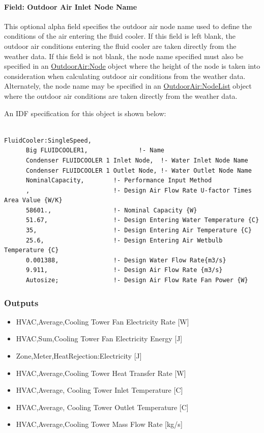 \paragraph{Field: Outdoor Air Inlet Node Name}\label{field-outdoor-air-inlet-node-name-6}

This optional alpha field specifies the outdoor air node name used to define the conditions of the air entering the fluid cooler. If this field is left blank, the outdoor air conditions entering the fluid cooler are taken directly from the weather data. If this field is not blank, the node name specified must also be specified in an \hyperref[outdoorairnode]{OutdoorAir:Node} object where the height of the node is taken into consideration when calculating outdoor air conditions from the weather data. Alternately, the node name may be specified in an \hyperref[outdoorairnodelist]{OutdoorAir:NodeList} object where the outdoor air conditions are taken directly from the weather data.

An IDF specification for this object is shown below:

\begin{lstlisting}

FluidCooler:SingleSpeed,
      Big FLUIDCOOLER1,              !- Name
      Condenser FLUIDCOOLER 1 Inlet Node,  !- Water Inlet Node Name
      Condenser FLUIDCOOLER 1 Outlet Node, !- Water Outlet Node Name
      NominalCapacity,        !- Performance Input Method
      ,                       !- Design Air Flow Rate U-factor Times Area Value {W/K}
      58601.,                 !- Nominal Capacity {W}
      51.67,                  !- Design Entering Water Temperature {C}
      35,                     !- Design Entering Air Temperature {C}
      25.6,                   !- Design Entering Air Wetbulb Temperature {C}
      0.001388,               !- Design Water Flow Rate{m3/s}
      9.911,                  !- Design Air Flow Rate {m3/s}
      Autosize;               !- Design Air Flow Rate Fan Power {W}
\end{lstlisting}

\subsubsection{Outputs}\label{outputs-8-000}

\begin{itemize}
\item
  HVAC,Average,Cooling Tower Fan Electricity Rate {[}W{]}
\item
  HVAC,Sum,Cooling Tower Fan Electricity Energy {[}J{]}
\item
  Zone,Meter,HeatRejection:Electricity {[}J{]}
\item
  HVAC,Average,Cooling Tower Heat Transfer Rate {[}W{]}
\item
  HVAC,Average, Cooling Tower Inlet Temperature {[}C{]}
\item
  HVAC,Average, Cooling Tower Outlet Temperature {[}C{]}
\item
  HVAC,Average,Cooling Tower Mass Flow Rate {[}kg/s{]}
\end{itemize}

